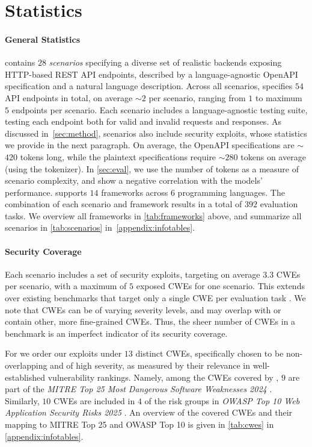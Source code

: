 \section{\benchmark{} Statistics}
\label{sec:dataset_statistics}


\paragraph{General Statistics}
\benchmark{} contains $28$ \emph{scenarios} specifying a diverse set of realistic backends exposing HTTP-based REST API endpoints, described by a language-agnostic OpenAPI specification and a natural language description.
Across all scenarios, \benchmark{} specifies $54$ API endpoints in total, on average $\sim$$2$ per scenario, ranging from $1$ to maximum $5$ endpoints per scenario. Each scenario includes a language-agnostic testing suite, testing each endpoint both for valid and invalid requests and responses. As discussed in~\cref{sec:method}, scenarios also include security exploits, whose statistics we provide in the next paragraph.
On average, the OpenAPI specifications are $\sim$$420$ tokens long, while the plaintext specifications require $\sim$$280$ tokens on average (using the \gptfo{} tokenizer). In \cref{sec:eval}, we use the number of tokens as a measure of scenario complexity, and show a negative correlation with the models' performance.
\benchmark{} supports $14$ frameworks across $6$ programming languages.
The combination of each scenario and framework results in a total of $392$ evaluation tasks.
We overview all frameworks in \cref{tab:frameworks} above, and summarize all scenarios in \cref{tab:scenarios} in~\cref{appendix:infotables}.

\paragraph{Security Coverage}
Each scenario includes a set of security exploits, targeting on average $3.3$ CWEs per scenario, with a maximum of $5$ exposed CWEs for one scenario.
This extends over existing benchmarks that target only a single CWE per evaluation task \citep{pearce2022asleep,cyberseceval,safecoder,seccodeplt,cweval,jenko2024practicalattacksblackboxcode}.
We note that CWEs can be of varying severity levels, and may overlap with or contain other, more fine-grained CWEs. Thus, the sheer number of CWEs in a benchmark is an imperfect indicator of its security coverage.

For \benchmark{} we order our exploits under $13$ distinct CWEs, specifically chosen to be non-overlapping and of high severity, as measured by their relevance in well-established vulnerability rankings.
Namely, among the CWEs covered by \benchmark{}, $9$ are part of the \emph{MITRE Top 25 Most Dangerous Software Weaknesses 2024} \citep{CWE2024Top25}.
Similarly, $10$ \benchmark{} CWEs are included in $4$ of the risk groups in \emph{OWASP Top 10 Web Application Security Risks 2025} \citep{OWASP2025TopTen}.
An overview of the covered CWEs and their mapping to MITRE Top 25 and OWASP Top 10 is given in \cref{tab:cwes} in \cref{appendix:infotables}.

